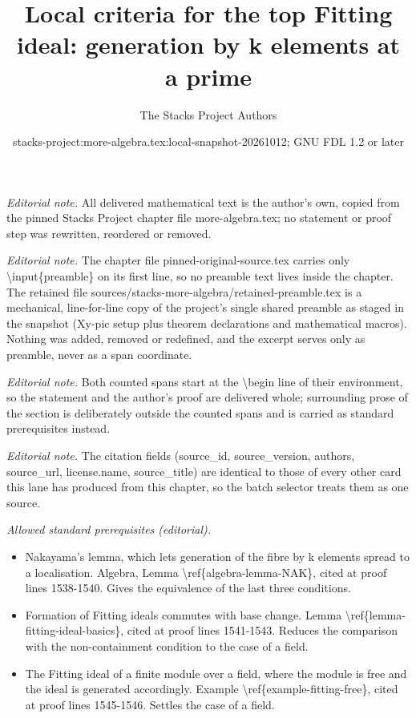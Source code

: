 \documentclass[10pt,a4paper]{amsart}
\title{Local criteria for the top Fitting ideal: generation by k elements at a prime}
\author{The Stacks Project Authors}
\date{stacks-project:more-algebra.tex:local-snapshot-20261012; GNU FDL 1.2 or later}
\theoremstyle{plain}
\theoremstyle{definition}
\theoremstyle{remark}
\numberwithin{equation}{subsection}
\begin{document}
\maketitle
\setcounter{subsection}{1}
\noindent\textit{Editorial note.} All delivered mathematical text is the author's own, copied from the pinned Stacks Project chapter file more-algebra.tex; no statement or proof step was rewritten, reordered or removed.\par\medskip
\noindent\textit{Editorial note.} The chapter file pinned-original-source.tex carries only \textbackslash{}input\{preamble\} on its first line, so no preamble text lives inside the chapter. The retained file sources/stacks-more-algebra/retained-preamble.tex is a mechanical, line-for-line copy of the project's single shared preamble as staged in the snapshot (Xy-pic setup plus theorem declarations and mathematical macros). Nothing was added, removed or redefined, and the excerpt serves only as preamble, never as a span coordinate.\par\medskip
\noindent\textit{Editorial note.} Both counted spans start at the \textbackslash{}begin line of their environment, so the statement and the author's proof are delivered whole; surrounding prose of the section is deliberately outside the counted spans and is carried as standard prerequisites instead.\par\medskip
\noindent\textit{Editorial note.} The citation fields (source\_id, source\_version, authors, source\_url, license.name, source\_title) are identical to those of every other card this lane has produced from this chapter, so the batch selector treats them as one source.\par\medskip
\noindent\textit{Allowed standard prerequisites (editorial).}\begin{itemize}
\item Nakayama's lemma, which lets generation of the fibre by k elements spread to a localisation. Algebra, Lemma \textbackslash{}ref\{algebra-lemma-NAK\}, cited at proof lines 1538-1540. Gives the equivalence of the last three conditions.
\item Formation of Fitting ideals commutes with base change. Lemma \textbackslash{}ref\{lemma-fitting-ideal-basics\}, cited at proof lines 1541-1543. Reduces the comparison with the non-containment condition to the case of a field.
\item The Fitting ideal of a finite module over a field, where the module is free and the ideal is generated accordingly. Example \textbackslash{}ref\{example-fitting-free\}, cited at proof lines 1545-1546. Settles the case of a field.
\end{itemize}\medskip
\end{document}
